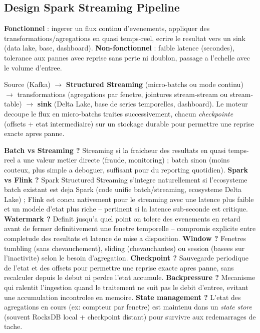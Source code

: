 \documentclass[11pt,a4paper]{article}
\newenvironment{sujet}[1]{%
  \subsection{#1}
}{%
  \bigskip
}
\begin{document}
\begin{sujet}{Design Spark Streaming Pipeline}

\begin{req}
\textbf{Fonctionnel} : ingerer un flux continu d'evenements, appliquer des transformations/agregations en quasi temps-reel, ecrire le resultat vers un sink (data lake, base, dashboard). \textbf{Non-fonctionnel} : faible latence (secondes), tolerance aux pannes avec reprise sans perte ni doublon, passage a l'echelle avec le volume d'entree.
\end{req}

\begin{archbox}
Source (Kafka) $\to$ \textbf{Structured Streaming} (micro-batchs ou mode continu) $\to$ transformations (agregations par fenetre, jointures stream-stream ou stream-table) $\to$ \textbf{sink} (Delta Lake, base de series temporelles, dashboard). Le moteur decoupe le flux en micro-batchs traites successivement, chacun \emph{checkpointe} (offsets + etat intermediaire) sur un stockage durable pour permettre une reprise exacte apres panne.
\end{archbox}

\begin{tradeoff}
\textbf{Batch vs Streaming ?} Streaming si la fraicheur des resultats en quasi temps-reel a une valeur metier directe (fraude, monitoring) ; batch sinon (moins couteux, plus simple a deboguer, suffisant pour du reporting quotidien). \textbf{Spark vs Flink ?} Spark Structured Streaming s'integre naturellement si l'ecosysteme batch existant est deja Spark (code unifie batch/streaming, ecosysteme Delta Lake) ; Flink est concu nativement pour le streaming avec une latence plus faible et un modele d'etat plus riche -- pertinent si la latence sub-seconde est critique. \textbf{Watermark ?} Definit jusqu'a quel point on tolere des evenements en retard avant de fermer definitivement une fenetre temporelle -- compromis explicite entre completude des resultats et latence de mise a disposition. \textbf{Window ?} Fenetres tumbling (sans chevauchement), sliding (chevauchantes) ou session (basees sur l'inactivite) selon le besoin d'agregation. \textbf{Checkpoint ?} Sauvegarde periodique de l'etat et des offsets pour permettre une reprise exacte apres panne, sans recalculer depuis le debut ni perdre l'etat accumule. \textbf{Backpressure ?} Mecanisme qui ralentit l'ingestion quand le traitement ne suit pas le debit d'entree, evitant une accumulation incontrolee en memoire. \textbf{State management ?} L'etat des agregations en cours (ex: compteur par fenetre) est maintenu dans un \emph{state store} (souvent RocksDB local + checkpoint distant) pour survivre aux redemarrages de tache.
\end{tradeoff}

\end{sujet}
\end{document}
